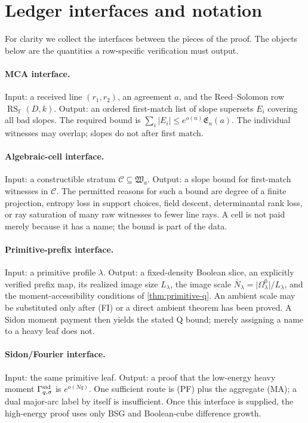 \documentclass[12pt,a4paper]{amsart}
\numberwithin{equation}{section}
\theoremstyle{remark}
\DeclareMathOperator{\RS}{RS}
\newcommand{\F}{\mathbb F}
\newcommand{\Ccal}{\mathcal C}
\newcommand{\Gsid}{\Gamma^{\rm sid}}
\newcommand{\barN}{\overline N}
\newcommand{\abs}[1]{\lvert #1\rvert}
\begin{document}
\section{Ledger interfaces and notation}\label{sec:interfaces}

For clarity we collect the interfaces between the pieces of the proof.  The objects below are the quantities a row-specific verification must output.

\paragraph{MCA interface.}
Input: a received line \((r_1,r_2)\), an agreement \(a\), and the Reed--Solomon row \(\RS_\F(D,k)\).  Output: an ordered first-match list of slope supersets \(E_i\) covering all bad slopes.  The required bound is \(\sum_i\abs{E_i}\le e^{o(n)}\mathfrak E_n(a)\).  The individual witnesses may overlap; slopes do not after first match.

\paragraph{Algebraic-cell interface.}
Input: a constructible stratum \(\Ccal\subseteq\mathfrak W_a\).  Output: a slope bound for first-match witnesses in \(\Ccal\).  The permitted reasons for such a bound are degree of a finite projection, entropy loss in support choices, field descent, determinantal rank loss, or ray saturation of many raw witnesses to fewer line rays.  A cell is not paid merely because it has a name; the bound is part of the data.

\paragraph{Primitive-prefix interface.}
Input: a primitive profile \(\lambda\).  Output: a fixed-density Boolean
slice, an explicitly verified prefix map, its realized image size
\(L_\lambda\), the image scale
\(\barN_\lambda=\abs{\Omega^0_\lambda}/L_\lambda\), and the
moment-accessibility conditions of \cref{thm:primitive-q}.  An ambient
scale may be substituted only after \textup{(FI)} or a direct ambient
theorem has been proved.  A Sidon moment payment then yields the stated Q
bound; merely assigning a name to a heavy leaf does not.

\paragraph{Sidon/Fourier interface.}
Input: the same primitive leaf.  Output: a proof that the low-energy heavy
moment \(\Gsid_{q,\sigma}\) is \(e^{o(Nq)}\).  One sufficient route is
\textup{(PF)} plus the aggregate \textup{(MA)}; a dual major-arc label by
itself is insufficient.  Once this interface is supplied, the high-energy
proof uses only BSG and Boolean-cube difference growth.
\end{document}
